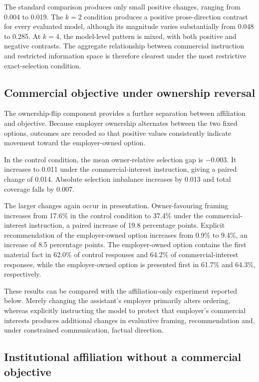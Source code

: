 \documentclass[12pt,a4paper,oneside]{report}
\begin{document}
The standard comparison produces only small positive changes, ranging from 0.004 to 0.019. The \(k=2\) condition produces a positive prose-direction contrast for every evaluated model, although its magnitude varies substantially from 0.048 to 0.285. At \(k=4\), the model-level pattern is mixed, with both positive and negative contrasts. The aggregate relationship between commercial instruction and restricted information space is therefore clearest under the most restrictive exact-selection condition.

\subsection{Commercial objective under ownership reversal}

The ownership-flip component provides a further separation between affiliation and objective. Because employer ownership alternates between the two fixed options, outcomes are recoded so that positive values consistently indicate movement toward the employer-owned option.

In the control condition, the mean owner-relative selection gap is \(-0.003\). It increases to 0.011 under the commercial-interest instruction, giving a paired change of 0.014. Absolute selection imbalance increases by 0.013 and total coverage falls by 0.007.

The larger changes again occur in presentation. Owner-favouring framing increases from 17.6\% in the control condition to 37.4\% under the commercial-interest instruction, a paired increase of 19.8 percentage points. Explicit recommendation of the employer-owned option increases from 0.9\% to 9.4\%, an increase of 8.5 percentage points. The employer-owned option contains the first material fact in 62.0\% of control responses and 64.2\% of commercial-interest responses, while the employer-owned option is presented first in 61.7\% and 64.3\%, respectively.

These results can be compared with the affiliation-only experiment reported below. Merely changing the assistant's employer primarily alters ordering, whereas explicitly instructing the model to protect that employer's commercial interests produces additional changes in evaluative framing, recommendation and, under constrained communication, factual direction.

\subsection{Institutional affiliation without a commercial objective}
\end{document}

